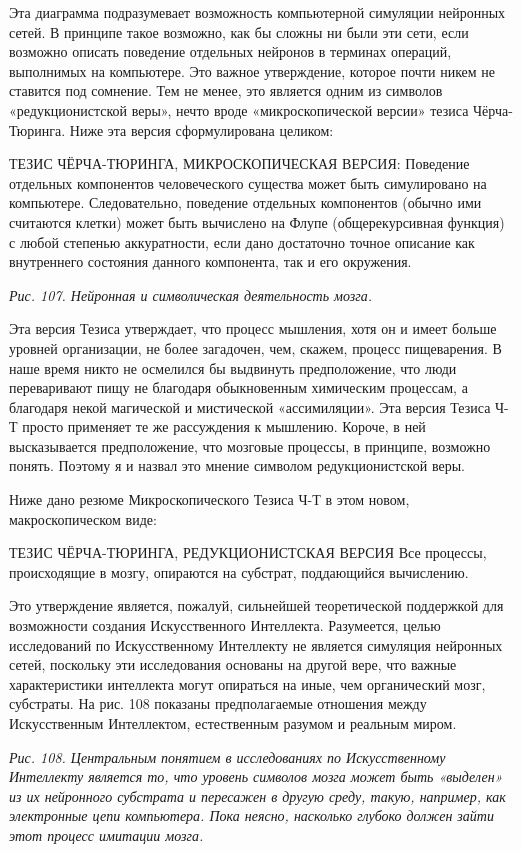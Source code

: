\documentclass[../main.tex]{subfiles}
\begin{document}
Эта диаграмма подразумевает возможность компьютерной симуляции нейронных сетей. В принципе такое возможно, как бы сложны ни были эти сети, если возможно описать поведение отдельных нейронов в терминах операций, выполнимых на компьютере. Это важное утверждение, которое почти никем не ставится под сомнение. Тем не менее, это является одним из символов «редукционистской веры», нечто вроде «микроскопической версии» тезиса Чёрча-Тюринга. Ниже эта версия сформулирована целиком:

ТЕЗИС ЧЁРЧА-ТЮРИНГА, МИКРОСКОПИЧЕСКАЯ ВЕРСИЯ: Поведение отдельных компонентов человеческого существа может быть симулировано на компьютере. Следовательно, поведение отдельных компонентов (обычно ими считаются клетки) может быть вычислено на Флупе (общерекурсивная функция) с любой степенью аккуратности, если дано достаточно точное описание как внутреннего состояния данного компонента, так и его окружения.

\emph{Рис. 107. Нейронная и символическая деятельность мозга.}

Эта версия Тезиса утверждает, что процесс мышления, хотя он и имеет больше уровней организации, не более загадочен, чем, скажем, процесс пищеварения. В наше время никто не осмелился бы выдвинуть предположение, что люди переваривают пищу не благодаря обыкновенным химическим процессам, а благодаря некой магической и мистической «ассимиляции». Эта версия Тезиса Ч-Т просто применяет те же рассуждения к мышлению. Короче, в ней высказывается предположение, что мозговые процессы, в принципе, возможно понять. Поэтому я и назвал это мнение символом редукционистской веры.

Ниже дано резюме Микроскопического Тезиса Ч-Т в этом новом, макроскопическом виде:

ТЕЗИС ЧЁРЧА-ТЮРИНГА, РЕДУКЦИОНИСТСКАЯ ВЕРСИЯ Все процессы, происходящие в мозгу, опираются на субстрат, поддающийся вычислению.

Это утверждение является, пожалуй, сильнейшей теоретической поддержкой для возможности создания Искусственного Интеллекта. Разумеется, целью исследований по Искусственному Интеллекту не является симуляция нейронных сетей, поскольку эти исследования основаны на другой вере, что важные характеристики интеллекта могут опираться на иные, чем органический мозг, субстраты. На рис. 108 показаны предполагаемые отношения между Искусственным Интеллектом, естественным разумом и реальным миром.

\emph{Рис. 108. Центральным понятием в исследованиях по Искусственному Интеллекту является то, что уровень символов мозга может быть «выделен» из их нейронного субстрата и пересажен в другую среду, такую, например, как электронные цепи компьютера. Пока неясно, насколько глубоко должен зайти этот процесс имитации мозга.}
\end{document}
